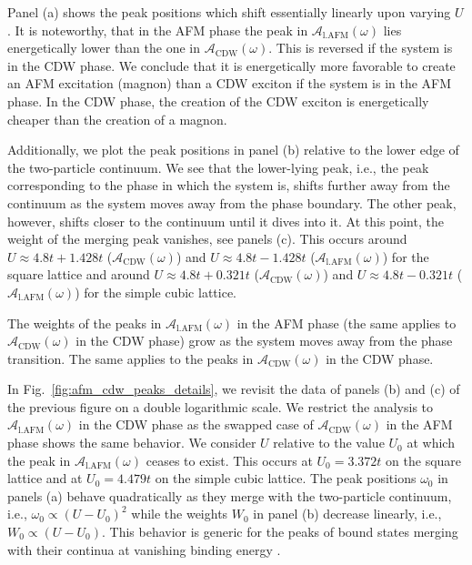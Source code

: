 \documentclass[
    reprint, 
    aps,
    preprintnumbers,
    twocolumn,
    prb,
    superscriptaddress
]{revtex4-2}
\newcommand{\spectral}[1]{\mathcal{A}_\text{#1}  (\omega)}
\begin{document}
Panel (a) shows the peak positions which shift essentially linearly upon varying $U$.
It is noteworthy, that in the AFM phase the peak in $\spectral{l.AFM}$ lies energetically
lower than the one in $\spectral{CDW}$.
This is reversed if the system is in the CDW phase.
We conclude that it is energetically more favorable to create an AFM excitation (magnon) than a CDW
exciton if the system is in the AFM phase. In the CDW phase, the creation of the CDW exciton is
energetically cheaper than the creation of a magnon.

Additionally, we plot the peak positions in panel (b) relative to the lower edge of the two-particle continuum.
We see that the lower-lying peak, i.e., the peak corresponding to the phase in which the system is, 
shifts further away from the continuum as the system moves away from the phase boundary.
The other peak, however, shifts closer to the continuum until it dives into it.
At this point, the weight of the merging peak vanishes, see panels (c).
This occurs around $U \approx 4.8t + 1.428t$ ($\spectral{CDW}$) and $U \approx 4.8t - 1.428t$ ($\spectral{l.AFM}$) for the square lattice 
and around $U \approx 4.8t + 0.321t$  ($\spectral{CDW}$) and $U \approx 4.8t - 0.321t$  ($\spectral{l.AFM}$) for the simple cubic lattice.

The weights of the peaks in $\spectral{l.AFM}$ in the AFM phase (the same applies to $\spectral{CDW}$ in the CDW phase) grow as the system moves away from the phase transition.
The same applies to the peaks in $\spectral{CDW}$ in the CDW phase.

In Fig.\ \ref{fig:afm_cdw_peaks_details}, we revisit the data of panels (b) and (c) of the previous figure
on a double logarithmic scale.
We restrict the analysis to $\spectral{l.AFM}$ in the CDW phase as the swapped case of $\spectral{CDW}$ in the 
AFM phase shows the same behavior.
We consider $U$ relative to the value $U_0$ at which the peak in $\spectral{l.AFM}$ ceases to exist.
This occurs at $U_0 = 3.372t$ on the square lattice and at $U_0 = 4.479t$ on the simple cubic lattice.
The peak positions $\omega_0$ in panels (a) behave quadratically as they merge with the 
two-particle continuum, i.e., 
$\omega_0 \propto (U-U_0)^2$ while the weights $W_0$ in panel (b) decrease linearly, i.e., 
$W_0 \propto (U-U_0)$. This behavior is generic for the peaks of bound states merging with
their continua at vanishing binding energy \cite{uhrig96b,uhrig96be,zhito13}.

\end{document}
